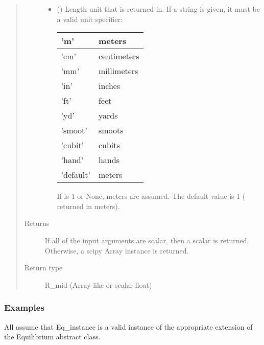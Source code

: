 \documentclass[letterpaper,10pt,english]{sphinxmanual}
\begin{document}
\begin{fulllineitems}
\begin{fulllineitems}
\begin{quote}
\begin{description}
\begin{itemize}
\item {} 
 () \textendash{} 
Length unit that  is returned in.
If a string is given, it must be a valid unit specifier:


\begin{savenotes}\sphinxattablestart
\centering
\begin{tabulary}{\linewidth}[t]{|T|T|}
\hline

’m’
&
meters
\\
\hline
’cm’
&
centimeters
\\
\hline
’mm’
&
millimeters
\\
\hline
’in’
&
inches
\\
\hline
’ft’
&
feet
\\
\hline
’yd’
&
yards
\\
\hline
’smoot’
&
smoots
\\
\hline
’cubit’
&
cubits
\\
\hline
’hand’
&
hands
\\
\hline
’default’
&
meters
\\
\hline
\end{tabulary}
\par
\sphinxattableend\end{savenotes}

If  is 1 or None, meters are assumed. The default
value is 1 ( returned in meters).


\end{itemize}

\item[{Returns}] \leavevmode
If all of the input arguments
are scalar, then a scalar is returned. Otherwise, a scipy Array
instance is returned.

\item[{Return type}] \leavevmode
R\_mid (Array-like or scalar float)

\end{description}\end{quote}
\subsubsection*{Examples}

All assume that Eq\_instance is a valid instance of the appropriate
extension of the Equilibrium abstract class.


\end{fulllineitems}
\end{fulllineitems}
\end{document}
